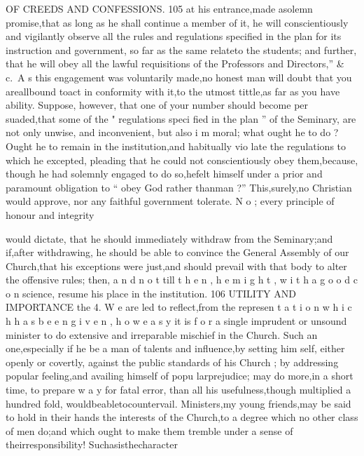 \documentclass[
]{book}
\begin{document}
OF CREEDS AND CONFESSIONS. 105
at his entrance,made asolemn promise,that as long as he shall continue a member of it, he will conscientiously and vigilantly observe all the rules and regulations specified in the plan for its instruction and government, so far as the same relateto the students; and further, that he will obey all the lawful requisitions of the Professors and Directors,'' \& c.~A s this
engagement was voluntarily made,no honest man will doubt that you areallbound toact
in conformity with it,to the utmost tittle,as far as you have ability. Suppose, however, that one of your number should become per suaded,that some of the " regulations speci fied in the plan '' of the Seminary, are not only unwise, and inconvenient, but also i m moral; what ought he to do ? Ought he to remain in the institution,and habitually vio late the regulations to which he excepted,
pleading that he could not conscientiously obey them,because, though he had solemnly engaged to do so,hefelt himself under a prior and paramount obligation to `` obey God rather thanman ?'' This,surely,no Christian would approve, nor any faithful government tolerate. N o ; every principle of honour and integrity

would dictate, that he should immediately withdraw from the Seminary;and if,after withdrawing, he should be able to convince the General Assembly of our Church,that his exceptions were just,and should prevail with that body to alter the offensive rules; then, a n d n o t till t h e n , h e m i g h t , w i t h a g o o d c o n
science, resume his place in the institution.
106 UTILITY AND IMPORTANCE
the
4. W e are led to reflect,from the represen t a t i o n w h i c h h a s b e e n g i v e n , h o w e a s y it is f o r a single imprudent or unsound minister to
do extensive and irreparable mischief in the Church. Such an one,especially if he be a man of talents and influence,by setting him self, either openly or covertly, against the public standards of his Church ; by addressing popular feeling,and availing himself of popu larprejudice; may do more,in a short time, to prepare w a y for fatal error, than all his usefulness,though multiplied a hundred fold, wouldbeabletocountervail. Ministers,my young friends,may be said to hold in their
hands the interests of the Church,to a degree which no other class of men do;and which ought to make them tremble under a sense of theirresponsibility! Suchasisthecharacter
\end{document}

